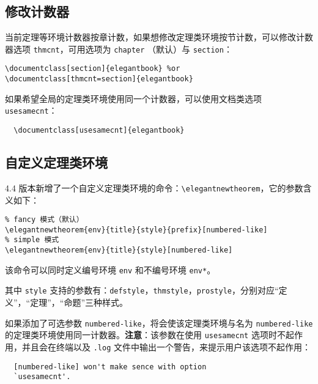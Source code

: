 \documentclass[lang=cn,newtx,10pt,scheme=chinese,color=black]{elegantbook}
\begin{document}
\subsection{修改计数器}

当前定理等环境计数器按章计数，如果想修改定理类环境按节计数，可以修改计数器选项 \lstinline{thmcnt}，可用选项为 \lstinline{chapter} （默认）与 \lstinline{section}：

\begin{lstlisting}
\documentclass[section]{elegantbook} %or
\documentclass[thmcnt=section]{elegantbook}
\end{lstlisting}

如果希望全局的定理类环境使用同一个计数器，可以使用文档类选项 \lstinline{usesamecnt}：

\begin{lstlisting}
  \documentclass[usesamecnt]{elegantbook}
\end{lstlisting}

\subsection{自定义定理类环境}

4.4 版本新增了一个自定义定理类环境的命令：\lstinline|\elegantnewtheorem|，它的参数含义如下：

\begin{lstlisting}
% fancy 模式（默认）
\elegantnewtheorem{env}{title}{style}{prefix}[numbered-like]
% simple 模式
\elegantnewtheorem{env}{title}{style}[numbered-like]
\end{lstlisting}
该命令可以同时定义编号环境 \lstinline|env| 和不编号环境 \lstinline|env*|。

其中 \lstinline|style| 支持的参数有：\lstinline|defstyle|，\lstinline|thmstyle|，\lstinline|prostyle|，分别对应“定义”，“定理”，“命题”三种样式。

如果添加了可选参数 \lstinline{numbered-like}，将会使该定理类环境与名为 \lstinline{numbered-like} 的定理类环境使用同一计数器。\textbf{注意}：该参数在使用 \lstinline{usesamecnt} 选项时不起作用，并且会在终端以及 \lstinline{.log} 文件中输出一个警告，来提示用户该选项不起作用：

\begin{lstlisting}
  [numbered-like] won't make sence with option
  `usesamecnt'.
\end{lstlisting}
\end{document}
